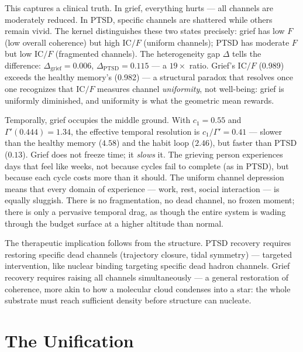 \documentclass[
  aps,
  prd,
  twocolumn,
  superscriptaddress,
  nofootinbib,
  floatfix
]{revtex4-2}
\newcommand{\Gam}{\Gamma}
\newcommand{\IC}{\mathrm{IC}}
\begin{document}
This captures a clinical truth.  In grief, everything hurts
--- all channels are moderately reduced.  In PTSD, specific
channels are shattered while others remain vivid.  The kernel
distinguishes these two states precisely: grief has low $F$
(low overall coherence) but high $\IC/F$ (uniform channels);
PTSD has moderate $F$ but low $\IC/F$ (fragmented channels).
The heterogeneity gap $\Delta$ tells the difference:
$\Delta_{\text{grief}} = 0.006$,
$\Delta_{\text{PTSD}} = 0.115$ --- a $19\times$ ratio.
Grief's $\IC/F$ (0.989) exceeds the healthy memory's (0.982)
--- a structural paradox that resolves once one recognizes
that $\IC/F$ measures channel \emph{uniformity}, not
well-being: grief is uniformly diminished, and uniformity
is what the geometric mean rewards.

Temporally, grief occupies the middle ground.  With $c_1 =
0.55$ and $\Gam'(0.444) = 1.34$, the effective temporal
resolution is $c_1/\Gam' = 0.41$ --- slower than the healthy
memory ($4.58$) and the habit loop ($2.46$), but faster than
PTSD ($0.13$).  Grief does not freeze time; it \emph{slows}
it.  The grieving person experiences days that feel like
weeks, not because cycles fail to complete (as in PTSD), but
because each cycle costs more than it should.  The uniform
channel depression means that every domain of experience ---
work, rest, social interaction --- is equally sluggish.
There is no fragmentation, no dead channel, no frozen moment;
there is only a pervasive temporal drag, as though the entire
system is wading through the budget surface at a higher
altitude than normal.

The therapeutic implication follows from the structure.
PTSD recovery requires restoring specific dead channels
(trajectory closure, tidal symmetry) --- targeted
intervention, like nuclear binding targeting specific
dead hadron channels.  Grief recovery requires raising all
channels simultaneously --- a general restoration of
coherence, more akin to how a molecular cloud condenses
into a star: the whole substrate must reach sufficient
density before structure can nucleate.


\section{The Unification}\label{sec:unification}
\end{document}
